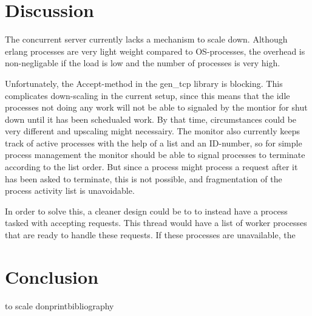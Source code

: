 \documentclass[12pt]{article}
\begin{document}
 \section{Discussion} 

 The concurrent server currently lacks a mechanism to scale down. Although erlang processes are very light weight compared to OS-processes, the overhead is non-negligable if the load is low and the number of processes is very high. 

 Unfortunately, the Accept-method in the gen\_tcp library is blocking. This complicates down-scaling in the current setup, since this means that the idle processes not doing any work will not be able to signaled by the montior for shut down until it has been schedualed work. By that time, circumstances could be very different and upscaling might necessairy. The monitor also currently keeps track of active processes with the help of a list and an ID-number, so for simple process
 management the monitor should be able to signal processes to terminate according to the list order. But since a process might process a request after it has been asked to terminate, this is not possible, and fragmentation of the process activity list is unavoidable. 

 In order to solve this, a cleaner design could be to to instead have a process tasked with accepting requests. This thread would have a list of worker processes that are ready to handle these requests. If these processes are unavailable, the 

 \section{Conclusion} 




 \newpage
 \ism to scale donprintbibliography
 
\end{document}
